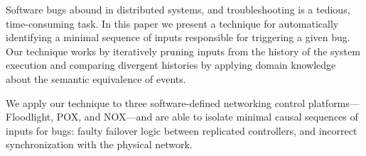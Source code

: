 Software bugs abound in distributed systems, and troubleshooting
is a tedious, time-consuming task.
In this paper we present a technique for automatically identifying
a minimal sequence of inputs responsible for triggering a given bug.
Our technique works by
iteratively pruning inputs from the history of the system execution and
comparing divergent histories
by applying domain knowledge about the semantic equivalence of events.

We apply our technique to three software-defined networking control
platforms---Floodlight, POX, and NOX---and
are able to isolate minimal causal sequences of inputs for
 bugs: faulty failover logic between replicated controllers, and incorrect
synchronization with the physical network.
